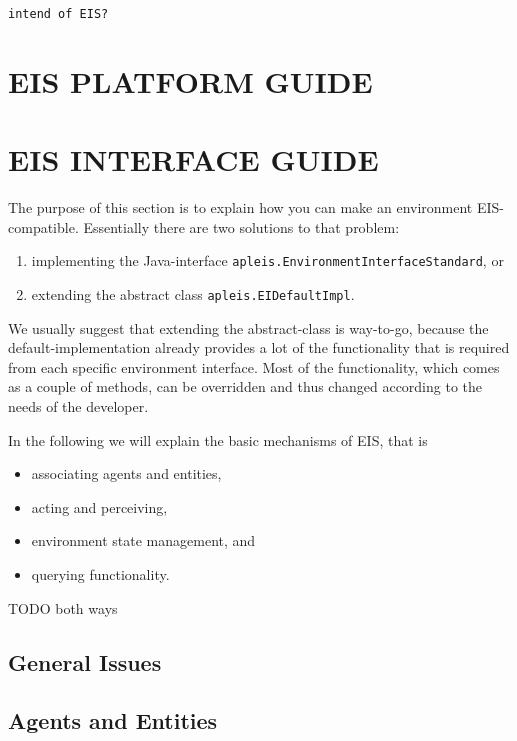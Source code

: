 \documentclass[a4]{article}
\newcommand{\EIS}{\textsf{EIS}\xspace}
\begin{document}
\begin{verbatim}
intend of EIS?
\end{verbatim}


\section{EIS PLATFORM GUIDE}


\section{EIS INTERFACE GUIDE}

The purpose of this section is to explain how you can make an environment \EIS-compatible. 
Essentially there are two solutions to that problem:
\begin{enumerate}
\item implementing the Java-interface \texttt{apleis.EnvironmentInterfaceStandard}, or
\item extending the abstract class \texttt{apleis.EIDefaultImpl}.
\end{enumerate}

We usually suggest that extending the abstract-class is way-to-go, because the default-implementation
already provides a lot of the functionality that is required from each specific environment interface.
Most of the functionality, which comes as a couple of methods, can be overridden and thus changed
according to the needs of the developer.

In the following we will explain the basic mechanisms of \EIS, that is
\begin{itemize}
\item associating agents and entities,
\item acting and perceiving,
\item environment state management, and
\item querying functionality.
\end{itemize}

TODO both ways

\subsection{General Issues}

\subsection{Agents and Entities}
\end{document}
